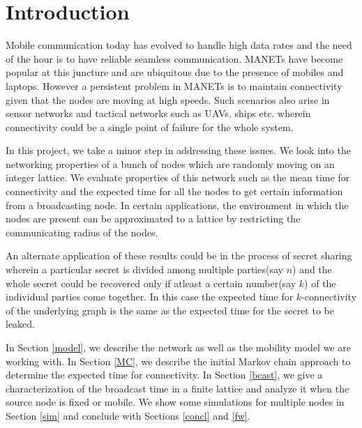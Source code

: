 \documentclass[a4paper,10pt,english]{article}
\begin{document}
\section{Introduction}
\par Mobile communication today has evolved to handle high data rates and the need of the hour is to have reliable seamless communication. MANETs have become popular at this juncture and are ubiquitous due to the presence of mobiles and laptops. However a persistent problem in MANETs is to maintain connectivity given that the nodes are moving at high speeds. Such scenarios also arise in sensor networks and tactical networks such as UAVs, ships etc. wherein connectivity could be a single point of failure for the whole system.
\par In this project, we take a minor step in addressing these issues. We look into the networking properties of a bunch of nodes which are randomly moving on an integer lattice. We evaluate properties of this network such as the mean time for connectivity and the expected time for all the nodes to get certain information from a broadcasting node. In certain applications, the environment in which the nodes are present can be approximated to a lattice by restricting the communicating radius of the nodes.
\par An alternate application of these results could be in the process of secret sharing wherein a particular secret is divided among multiple parties(say $n$) and the whole secret could be recovered only if atleast a certain number(say $k$) of the individual parties come together. In this case the expected time for $k$-connectivity of the underlying graph is the same as the expected time for the secret to be leaked. 
\par In Section \ref{model}, we describe the network as well as the mobility model we are working with. In Section \ref{MC}, we describe the initial Markov chain approach to determine the expected time for connectivity. In Section \ref{bcast}, we give a characterization of the broadcast time in a finite lattice and analyze it when the source node is fixed or mobile. We show some simulations for multiple nodes in Section \ref{sim} and conclude with Sections \ref{concl} and \ref{fw}.
\end{document}
